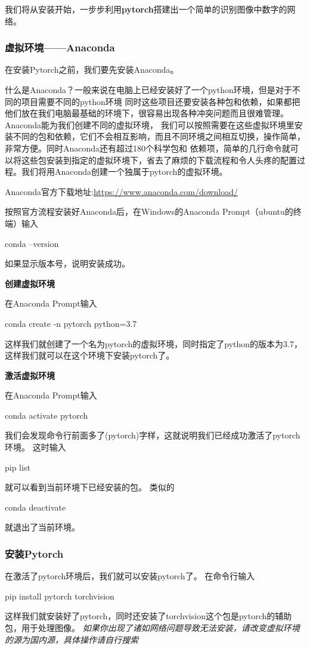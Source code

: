 我们将从安装开始，一步步利用\textbf{pytorch}搭建出一个简单的识别图像中数字的网络。
\subsubsection{虚拟环境——Anaconda}
在安装Pytorch之前，我们要先安装Anaconda。

什么是Anaconda？一般来说在电脑上已经安装好了一个python环境，但是对于不同的项目需要不同的python环境
同时这些项目还要安装各种包和依赖，如果都把他们放在我们电脑最基础的环境下，很容易出现各种冲突问题而且很难管理。Anaconda能为我们创建不同的虚拟环境，
我们可以按照需要在这些虚拟环境里安装不同的包和依赖，它们不会相互影响，而且不同环境之间相互切换，操作简单，非常方便。同时Anaconda还有超过180个科学包和
依赖项，简单的几行命令就可以将这些包安装到指定的虚拟环境下，省去了麻烦的下载流程和令人头疼的配置过程。我们将用Anaconda创建一个独属于pytorch的虚拟环境。

Anaconda官方下载地址:\url{https://www.anaconda.com/download/}

按照官方流程安装好Anaconda后，在Windows的Anaconda Prompt（ubuntu的终端）输入
\begin{tbash}
    conda --version
\end{tbash}
如果显示版本号，说明安装成功。

\textbf{创建虚拟环境}

在Anaconda Prompt输入
\begin{tbash}
    conda create -n pytorch python=3.7
\end{tbash}
这样我们就创建了一个名为pytorch的虚拟环境，同时指定了python的版本为3.7，这样我们就可以在这个环境下安装pytorch了。

\textbf{激活虚拟环境}

在Anaconda Prompt输入
\begin{tbash}
    conda activate pytorch
\end{tbash}
我们会发现命令行前面多了(pytorch)字样，这就说明我们已经成功激活了pytorch环境。
这时输入
\begin{tbash}
    pip list
\end{tbash}
就可以看到当前环境下已经安装的包。
类似的
\begin{tbash}
    conda deactivate
\end{tbash}
就退出了当前环境。

\subsubsection{安装Pytorch}
在激活了pytorch环境后，我们就可以安装pytorch了。
在命令行输入
\begin{tbash}
    pip install pytorch torchvision
\end{tbash}
这样我们就安装好了pytorch，同时还安装了torchvision这个包是pytorch的辅助包，用于处理图像。
\textit{如果你出现了诸如网络问题导致无法安装，请改变虚拟环境的源为国内源，具体操作请自行搜索}

